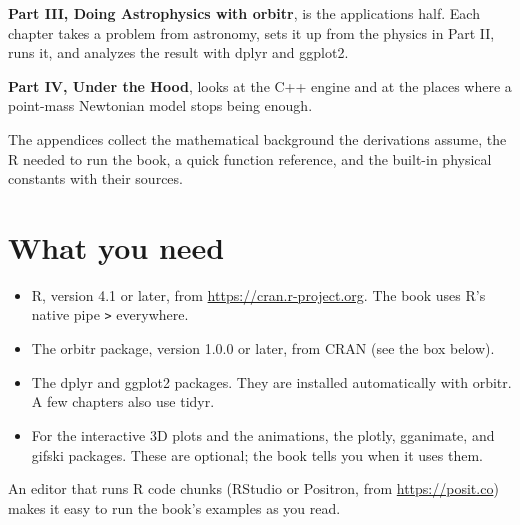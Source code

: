 \documentclass[
  10.5pt,
  letterpaper,
]{scrbook}
\providecommand{\tightlist}{%
  \setlength{\itemsep}{0pt}\setlength{\parskip}{0pt}}
\theoremstyle{plain}
\theoremstyle{remark}
\begin{document}
\textbf{Part III, Doing Astrophysics with orbitr}, is the applications
half. Each chapter takes a problem from astronomy, sets it up from the
physics in Part II, runs it, and analyzes the result with dplyr and
ggplot2.

\textbf{Part IV, Under the Hood}, looks at the C++ engine and at the
places where a point-mass Newtonian model stops being enough.

The appendices collect the mathematical background the derivations
assume, the R needed to run the book, a quick function reference, and
the built-in physical constants with their sources.

\section*{What you need}\label{what-you-need}


\begin{itemize}
\tightlist
\item
  R, version 4.1 or later, from \url{https://cran.r-project.org}. The
  book uses R's native pipe \texttt{\textbar{}\textgreater{}}
  everywhere.
\item
  The orbitr package, version 1.0.0 or later, from CRAN (see the box
  below).
\item
  The dplyr and ggplot2 packages. They are installed automatically with
  orbitr. A few chapters also use tidyr.
\item
  For the interactive 3D plots and the animations, the plotly,
  gganimate, and gifski packages. These are optional; the book tells you
  when it uses them.
\end{itemize}

An editor that runs R code chunks (RStudio or Positron, from
\url{https://posit.co}) makes it easy to run the book's examples as you
read.
\end{document}

